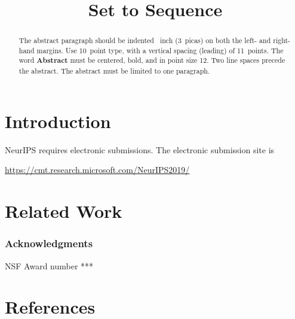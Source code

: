 \documentclass{article}
\title{Set to Sequence}
\author{
}
\begin{document}
\maketitle

\begin{abstract}
  The abstract paragraph should be indented ~inch (3~picas) on
  both the left- and right-hand margins. Use 10~point type, with a vertical
  spacing (leading) of 11~points.  The word \textbf{Abstract} must be centered,
  bold, and in point size 12. Two line spaces precede the abstract. The abstract
  must be limited to one paragraph.
\end{abstract}

\section{Introduction}

NeurIPS requires electronic submissions.  The electronic submission site is
\begin{center}
  \url{https://cmt.research.microsoft.com/NeurIPS2019/}
\end{center}



\section{Related Work}
\label{sec:rw}


\subsubsection*{Acknowledgments}

NSF Award number ***

\section*{References}

\subsection{\cite{vinyals2015order: Order matters}}
\end{document}
